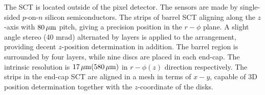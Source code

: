 The SCT is located outside of the pixel detector. 
The sensors are made by single-sided $p$-on-$n$ silicon semiconductors.
The strips of barrel SCT aligning along the $z$-axis with $80 \, \mathrm{\mu m}$ pitch, giving a precision position in the $r-\phi$ plane. 
A slight angle stereo (40 mrad) alternated by layers is applied to the arrangement, 
providing decent $z$-position determination in addition. 
The barrel region is surrounded by four layers, while nine discs are placed in each end-cap.
The intrinsic resolution is $17\, \mathrm{\mu m} (580 \, \mathrm{\mu m})$ in $r-\phi (z)$ direction respectively.
The strips in the end-cap SCT are aligned in a mesh in terms of $x-y$, capable of 3D position determination together with the $z$-coordinate of the disks.






